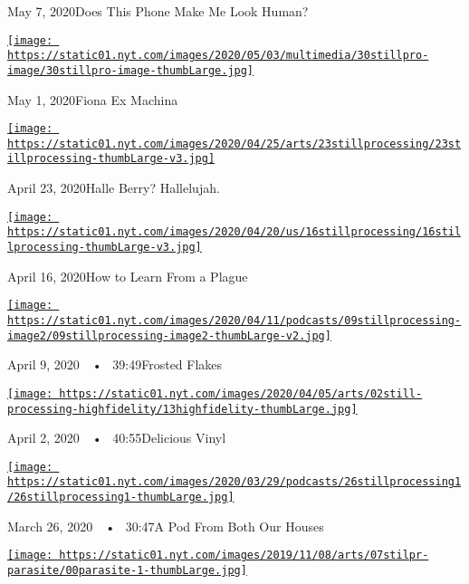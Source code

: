 May 7, 2020Does This Phone Make Me Look Human?

\href{https://www.nytimes.com/2020/04/30/podcasts/still-processing-fiona-apple-fetch-bolt-cutters.html?action=click\&module=audio-series-bar\&region=header\&pgtype=Article}{\texttt{[image: https://static01.nyt.com/images/2020/05/03/multimedia/30stillpro-image/30stillpro-image-thumbLarge.jpg]}}

May 1, 2020Fiona Ex Machina

\href{https://www.nytimes.com/2020/04/23/podcasts/still-processing-halle-berry-sharon-stone-catwoman-quarantine.html?action=click\&module=audio-series-bar\&region=header\&pgtype=Article}{\texttt{[image: https://static01.nyt.com/images/2020/04/25/arts/23stillprocessing/23stillprocessing-thumbLarge-v3.jpg]}}

April 23, 2020Halle Berry? Hallelujah.

\href{https://www.nytimes.com/2020/04/16/podcasts/still-processing-AIDS-survive-coronavirus.html?action=click\&module=audio-series-bar\&region=header\&pgtype=Article}{\texttt{[image: https://static01.nyt.com/images/2020/04/20/us/16stillprocessing/16stillprocessing-thumbLarge-v3.jpg]}}

April 16, 2020How to Learn From a Plague

\href{https://www.nytimes.com/2020/04/09/podcasts/still-processing-tiger-king.html?action=click\&module=audio-series-bar\&region=header\&pgtype=Article}{\texttt{[image: https://static01.nyt.com/images/2020/04/11/podcasts/09stillprocessing-image2/09stillprocessing-image2-thumbLarge-v2.jpg]}}

April 9, 2020~~•~ 39:49Frosted Flakes

\href{https://www.nytimes.com/2020/04/02/podcasts/high-fidelity-zoe-kravitz.html?action=click\&module=audio-series-bar\&region=header\&pgtype=Article}{\texttt{[image: https://static01.nyt.com/images/2020/04/05/arts/02still-processing-highfidelity/13highfidelity-thumbLarge.jpg]}}

April 2, 2020~~•~ 40:55Delicious Vinyl

\href{https://www.nytimes.com/2020/03/26/podcasts/still-processing-quarantine.html?action=click\&module=audio-series-bar\&region=header\&pgtype=Article}{\texttt{[image: https://static01.nyt.com/images/2020/03/29/podcasts/26stillprocessing1/26stillprocessing1-thumbLarge.jpg]}}

March 26, 2020~~•~ 30:47A Pod From Both Our Houses

\href{https://www.nytimes.com/2019/11/07/podcasts/still-processing-parasite-watchmen-bong-joon-ho.html?action=click\&module=audio-series-bar\&region=header\&pgtype=Article}{\texttt{[image: https://static01.nyt.com/images/2019/11/08/arts/07stilpr-parasite/00parasite-1-thumbLarge.jpg]}}

